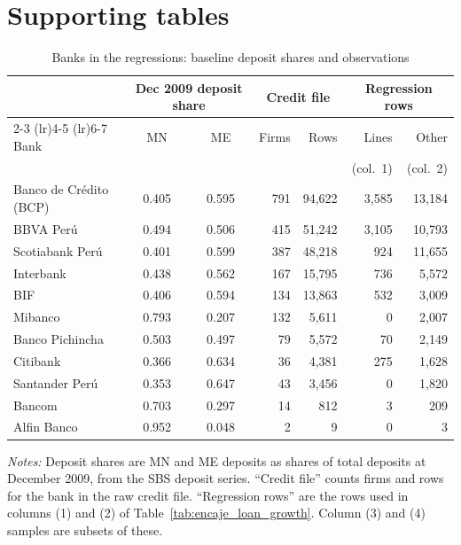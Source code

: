 \documentclass[11pt]{article}
\renewcommand{\_}{\origunderscore\hspace{0pt}}  %
\begin{document}
\section{Supporting tables}

\begin{table}[!h]
\centering
\small
\caption{Banks in the regressions: baseline deposit shares and observations}
\label{tab:banks}
\begin{tabular}{@{}lccrrrr@{}}
\toprule
 & \multicolumn{2}{c}{Dec 2009 deposit share} & \multicolumn{2}{c}{Credit file} & \multicolumn{2}{c}{Regression rows} \\
\cmidrule(lr){2-3} \cmidrule(lr){4-5} \cmidrule(lr){6-7}
Bank & MN & ME & Firms & Rows & Lines & Other \\
 & & & & & (col.\ 1) & (col.\ 2) \\
\midrule
Banco de Cr\'edito (BCP) & 0.405 & 0.595 & 791 & 94,622 & 3,585 & 13,184 \\
BBVA Per\'u & 0.494 & 0.506 & 415 & 51,242 & 3,105 & 10,793 \\
Scotiabank Per\'u & 0.401 & 0.599 & 387 & 48,218 & 924 & 11,655 \\
Interbank & 0.438 & 0.562 & 167 & 15,795 & 736 & 5,572 \\
BIF & 0.406 & 0.594 & 134 & 13,863 & 532 & 3,009 \\
Mibanco & 0.793 & 0.207 & 132 & 5,611 & 0 & 2,007 \\
Banco Pichincha & 0.503 & 0.497 & 79 & 5,572 & 70 & 2,149 \\
Citibank & 0.366 & 0.634 & 36 & 4,381 & 275 & 1,628 \\
Santander Per\'u & 0.353 & 0.647 & 43 & 3,456 & 0 & 1,820 \\
Bancom & 0.703 & 0.297 & 14 & 812 & 3 & 209 \\
Alfin Banco & 0.952 & 0.048 & 2 & 9 & 0 & 3 \\
\bottomrule
\end{tabular}
\par\smallskip
\begin{minipage}{0.95\textwidth}\footnotesize
\textit{Notes:} Deposit shares are MN and ME deposits as shares of total deposits at December 2009, from the SBS deposit series. ``Credit file'' counts firms and rows for the bank in the raw credit file. ``Regression rows'' are the rows used in columns (1) and (2) of Table~\ref{tab:encaje_loan_growth}. Column (3) and (4) samples are subsets of these.
\end{minipage}
\end{table}
\end{document}
